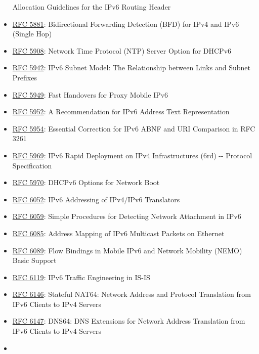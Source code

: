 \documentclass[
]{article}
\begin{document}
\begin{itemize}
  Allocation Guidelines for the IPv6 Routing Header
\item
  \href{https://www.rfc-editor.org/info/rfc5881}{RFC 5881}:
  Bidirectional Forwarding Detection (BFD) for IPv4 and IPv6 (Single
  Hop)
\item
  \href{https://www.rfc-editor.org/info/rfc5908}{RFC 5908}: Network Time
  Protocol (NTP) Server Option for DHCPv6
\item
  \href{https://www.rfc-editor.org/info/rfc5942}{RFC 5942}: IPv6 Subnet
  Model: The Relationship between Links and Subnet Prefixes
\item
  \href{https://www.rfc-editor.org/info/rfc5949}{RFC 5949}: Fast
  Handovers for Proxy Mobile IPv6
\item
  \href{https://www.rfc-editor.org/info/rfc5952}{RFC 5952}: A
  Recommendation for IPv6 Address Text Representation
\item
  \href{https://www.rfc-editor.org/info/rfc5954}{RFC 5954}: Essential
  Correction for IPv6 ABNF and URI Comparison in RFC 3261
\item
  \href{https://www.rfc-editor.org/info/rfc5969}{RFC 5969}: IPv6 Rapid
  Deployment on IPv4 Infrastructures (6rd) -\/- Protocol Specification
\item
  \href{https://www.rfc-editor.org/info/rfc5970}{RFC 5970}: DHCPv6
  Options for Network Boot
\item
  \href{https://www.rfc-editor.org/info/rfc6052}{RFC 6052}: IPv6
  Addressing of IPv4/IPv6 Translators
\item
  \href{https://www.rfc-editor.org/info/rfc6059}{RFC 6059}: Simple
  Procedures for Detecting Network Attachment in IPv6
\item
  \href{https://www.rfc-editor.org/info/rfc6085}{RFC 6085}: Address
  Mapping of IPv6 Multicast Packets on Ethernet
\item
  \href{https://www.rfc-editor.org/info/rfc6089}{RFC 6089}: Flow
  Bindings in Mobile IPv6 and Network Mobility (NEMO) Basic Support
\item
  \href{https://www.rfc-editor.org/info/rfc6119}{RFC 6119}: IPv6 Traffic
  Engineering in IS-IS
\item
  \href{https://www.rfc-editor.org/info/rfc6146}{RFC 6146}: Stateful
  NAT64: Network Address and Protocol Translation from IPv6 Clients to
  IPv4 Servers
\item
  \href{https://www.rfc-editor.org/info/rfc6147}{RFC 6147}: DNS64: DNS
  Extensions for Network Address Translation from IPv6 Clients to IPv4
  Servers
\item

\end{itemize}
\end{document}
